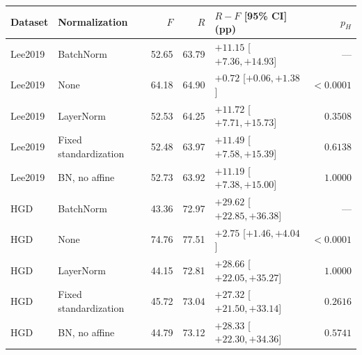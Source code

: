 \begin{tabular}{@{}llrrlr@{}}
\toprule
Dataset & Normalization & $F$ & $R$ & $R-F$ [95\% CI] (pp) & $p_H$ \\
\midrule
Lee2019 & BatchNorm & 52.65 & 63.79 & $+11.15$ [$ +7.36, +14.93 $] & --- \\
Lee2019 & None & 64.18 & 64.90 & $+0.72$ [$ +0.06, +1.38 $] & $<0.0001$ \\
Lee2019 & LayerNorm & 52.53 & 64.25 & $+11.72$ [$ +7.71, +15.73 $] & $0.3508$ \\
Lee2019 & Fixed standardization & 52.48 & 63.97 & $+11.49$ [$ +7.58, +15.39 $] & $0.6138$ \\
Lee2019 & BN, no affine & 52.73 & 63.92 & $+11.19$ [$ +7.38, +15.00 $] & $1.0000$ \\
HGD & BatchNorm & 43.36 & 72.97 & $+29.62$ [$ +22.85, +36.38 $] & --- \\
HGD & None & 74.76 & 77.51 & $+2.75$ [$ +1.46, +4.04 $] & $<0.0001$ \\
HGD & LayerNorm & 44.15 & 72.81 & $+28.66$ [$ +22.05, +35.27 $] & $1.0000$ \\
HGD & Fixed standardization & 45.72 & 73.04 & $+27.32$ [$ +21.50, +33.14 $] & $0.2616$ \\
HGD & BN, no affine & 44.79 & 73.12 & $+28.33$ [$ +22.30, +34.36 $] & $0.5741$ \\
\bottomrule
\end{tabular}
